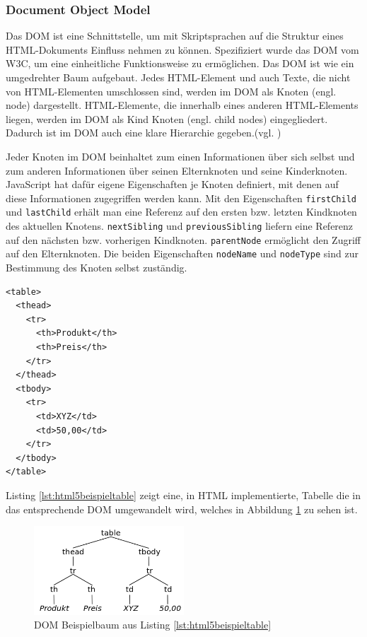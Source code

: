 \subsubsection{Document Object Model} Das DOM ist eine Schnittstelle, um mit Skriptsprachen auf die Struktur eines HTML-Dokuments Einfluss nehmen zu können. Spezifiziert wurde das DOM vom W3C, um eine einheitliche Funktionsweise zu ermöglichen. Das DOM ist wie ein umgedrehter Baum aufgebaut. Jedes HTML-Element und auch Texte, die nicht von HTML-Elementen umschlossen sind, werden im DOM als Knoten (engl. node) dargestellt. HTML-Elemente, die innerhalb eines anderen HTML-Elements liegen, werden im DOM als Kind Knoten (engl. child nodes) eingegliedert. Dadurch ist im DOM auch eine klare Hierarchie gegeben.(vgl. \cite[S.350]{WenzJava2008})\par Jeder Knoten im DOM beinhaltet zum einen Informationen über sich selbst und zum anderen Informationen über seinen Elternknoten und seine Kinderknoten. JavaScript hat dafür eigene Eigenschaften je Knoten definiert, mit denen auf diese Informationen zugegriffen werden kann. Mit den Eigenschaften \texttt{firstChild} und \texttt{lastChild} erhält man eine Referenz auf den ersten bzw. letzten Kindknoten des aktuellen Knotens. \texttt{nextSibling} und \texttt{previousSibling} liefern eine Referenz auf den nächsten bzw. vorherigen Kindknoten. \texttt{parentNode} ermöglicht den Zugriff auf den Elternknoten. Die beiden Eigenschaften \texttt{nodeName} und \texttt{nodeType} sind zur Bestimmung des Knoten selbst zuständig.

\vspace{1em}
\begin{lstlisting}[language=HTML5, caption=DOM5 Beispiel Definition, label=lst:html5beispieltable]
<table>
  <thead>
    <tr>
      <th>Produkt</th>
      <th>Preis</th>
    </tr>
  </thead>
  <tbody>
    <tr>
      <td>XYZ</td>
      <td>50,00</td>
    </tr>
  </tbody>
</table>
\end{lstlisting}

Listing \ref{lst:html5beispieltable} zeigt eine, in HTML implementierte, Tabelle die in das entsprechende DOM umgewandelt wird, welches in Abbildung \ref{fig:dombeispielbaum} zu sehen ist.

\vspace{1em}
\begin{figure}[htb]
  \centering
  \includegraphics[width=0.5\textwidth]{abb/dom_sampletree}
  \caption[DOM Beispielbaum aus Listing \ref{lst:html5beispieltable}]{DOM Beispielbaum aus Listing \ref{lst:html5beispieltable}}
  \label{fig:dombeispielbaum}
\end{figure}

